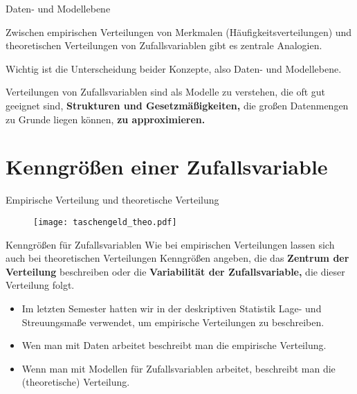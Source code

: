 \documentclass[usenames,dvipsnames,handout]{beamer}
\begin{document}
\begin{frame}{Daten- und Modellebene}%
\begin{description}
\item{Zwischen empirischen Verteilungen von Merkmalen (Häufigkeitsverteilungen) und theoretischen
Verteilungen von Zufallsvariablen gibt es zentrale Analogien.}\pause
\item{Wichtig ist die Unterscheidung beider Konzepte, also Daten- und Modellebene.}\pause
\item{Verteilungen von Zufallsvariablen sind als Modelle zu verstehen, die oft gut geeignet sind, \textbf{Strukturen und Gesetzmäßigkeiten,}
die großen Datenmengen zu Grunde liegen können, \textbf{zu approximieren.}}
\end{description}
\end{frame}
\section{Kenngrößen  einer Zufallsvariable}

\begin{frame}{Empirische Verteilung und theoretische Verteilung}
       
       \begin{figure}[ht]
 	\centering
 	      \texttt{[image: taschengeld\_theo.pdf]}
 	\end{figure}
\end{frame}



\begin{frame}{Kenngrößen für Zufallsvariablen}%
Wie bei empirischen Verteilungen lassen sich auch bei theoretischen Verteilungen Kenngrößen angeben, die das \textbf{Zentrum der Verteilung}
beschreiben oder die \textbf{Variabilität der Zufallsvariable,} die dieser Verteilung folgt.
\begin{itemize}
\item{Im letzten Semester hatten wir in der deskriptiven Statistik Lage- und Streuungsmaße verwendet, um empirische Verteilungen zu beschreiben. }
\item{Wen man mit Daten arbeitet beschreibt man die empirische Verteilung.}
\item{Wenn man mit Modellen für Zufallsvariablen arbeitet, beschreibt man die (theoretische) Verteilung.}
\end{itemize}
\end{frame}
\end{document}
